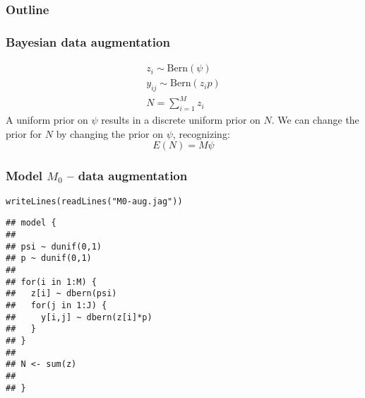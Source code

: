 \documentclass[color=usenames,dvipsnames]{beamer}\usepackage[]{graphicx}\usepackage[]{color}
\makeatletter
\newcommand{\hlstr}[1]{\textcolor[rgb]{0.749,0.012,0.012}{#1}}%
\newcommand{\hlstd}[1]{\textcolor[rgb]{0,0,0}{#1}}%
\newcommand{\hlkwd}[1]{\textcolor[rgb]{0.004,0.004,0.506}{#1}}%
\newenvironment{kframe}{%
 \def\at@end@of@kframe{}%
 \ifinner\ifhmode%
  \def\at@end@of@kframe{\end{minipage}}%
  \begin{minipage}{\columnwidth}%
 \fi\fi%
 \def\FrameCommand##1{\hskip\@totalleftmargin \hskip-\fboxsep
 \colorbox{shadecolor}{##1}\hskip-\fboxsep
     \hskip-\linewidth \hskip-\@totalleftmargin \hskip\columnwidth}%
 \MakeFramed {\advance\hsize-\width
   \@totalleftmargin\z@ \linewidth\hsize
   \@setminipage}}%
 {\par\unskip\endMakeFramed%
 \at@end@of@kframe}
\newenvironment{knitrout}{}{} %
\makeatother
\begin{document}
\begin{frame}
  \frametitle{Outline}
  \Large
\end{frame}



\begin{frame}
  \frametitle{Bayesian data augmentation}
  \begin{gather*}
    z_i \sim \mathrm{Bern}(\psi) \\
    y_{ij} \sim \mathrm{Bern}(z_ip) \\
    N = \sum_{i=1}^M z_i
  \end{gather*}
  \vfill
  A uniform prior on $\psi$ results in a discrete uniform prior on
  $N$. We can change the prior for $N$ by changing the prior on  
  $\psi$, recognizing:
  \[
    E(N)=M\psi
  \]
\end{frame}



\begin{frame}[fragile]
  \frametitle{Model $M_0$ -- data augmentation}
\vspace{-3pt}
\begin{knitrout}\small
{}\color{fgcolor}\begin{kframe}
\begin{alltt}
\hlkwd{writeLines}\hlstd{(}\hlkwd{readLines}\hlstd{(}\hlstr{"M0-aug.jag"}\hlstd{))}
\end{alltt}
\begin{verbatim}
## model {
## 
## psi ~ dunif(0,1)
## p ~ dunif(0,1)
## 
## for(i in 1:M) {
##   z[i] ~ dbern(psi)
##   for(j in 1:J) {
##     y[i,j] ~ dbern(z[i]*p)
##   }
## }
## 
## N <- sum(z)
## 
## }
\end{verbatim}
\end{kframe}
\end{knitrout}
\end{frame}
\end{document}
